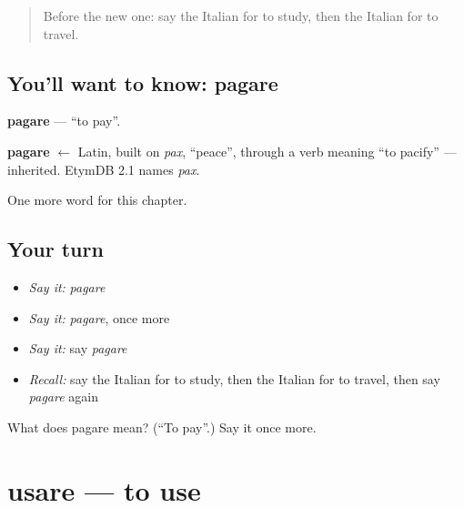 \label{lesson:IT-C60-pagare}



\begin{quote}
Before the new one: say the Italian for to study, then the Italian for to travel.
\end{quote}

\subsection*{You'll want to know: pagare}
\textbf{pagare} — \textquotedblleft{}to pay\textquotedblright{}.

\begin{cousinweb}
\textbf{pagare} $\leftarrow$ Latin, built on \emph{pax}, \textquotedblleft{}peace\textquotedblright{}, through a verb meaning \textquotedblleft{}to pacify\textquotedblright{} — inherited. EtymDB 2.1 names \emph{pax}.
\end{cousinweb}

\begin{grammarlens}[title={What you've built}]
One more word for this chapter.
\end{grammarlens}

\subsection*{Your turn}
\begin{itemize}
\raggedright
  \item \emph{Say it:} \emph{pagare}
  \item \emph{Say it:} \emph{pagare}, once more
  \item \emph{Say it:} say \emph{pagare}
  \item \emph{Recall:} say the Italian for to study, then the Italian for to travel, then say \emph{pagare} again
\end{itemize}

\begin{tcolorbox}[breakable,colback=teal!4,colframe=teal!35!black,title={Before you move on}]
What does pagare mean? (\textquotedblleft{}To pay\textquotedblright{}.) Say it once more.
\end{tcolorbox}
\section[usare]{usare — to use}

\label{lesson:IT-C60-usare}



